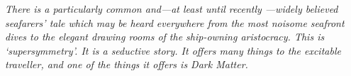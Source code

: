 
\begin{dedication} 

\textit{There is a particularly common and---at least until recently	---widely believed seafarers’ tale which may be heard everywhere from the most noisome seafront dives to the elegant drawing rooms of the ship-owning aristocracy. This is ‘supersymmetry’. It is a seductive story. It offers many things to the excitable traveller,	 and	 one of the things it offers is Dark Matter. }

\end{dedication}

